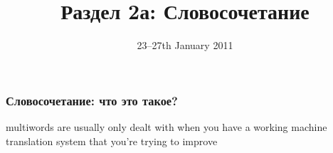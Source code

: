 \documentclass[10pt,xetex]{beamer} %
\date{23--27th January 2011}
\title{{\cyrtext Раздел 2а: Словосочетание}}
\begin{document}
\begin{frame}
	\titlepage
	\MyLogoBottomCentred
\end{frame}


\begin{frame}
	\frametitle{Словосочетание: что это такое?}
\end{frame}
multiwords are usually only dealt with when you have a working machine translation system that you're trying to improve
\end{document}
